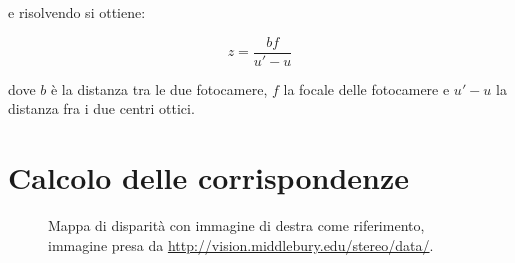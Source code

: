 \documentclass[12pt]{report}
\begin{document}
			\noindent e risolvendo si ottiene:

			\begin{equation}
				z=\frac{bf}{u'-u}
				\label{eq:soluzione}
			\end{equation}
			
			\noindent dove $b$ è la distanza tra le due fotocamere, $f$ la focale delle fotocamere e $u'-u$ la distanza fra i due centri ottici.
		
		
		\section{Calcolo delle corrispondenze}
		\label{sec:corrispondenze}
		
			\begin{figure}
				 \quad
				 \quad
				\caption{Mappa di disparità con immagine di destra come riferimento, immagine presa da \url{http://vision.middlebury.edu/stereo/data/}.}
				\label{fig:disparità}
			\end{figure}
			
			
			
\end{document}
